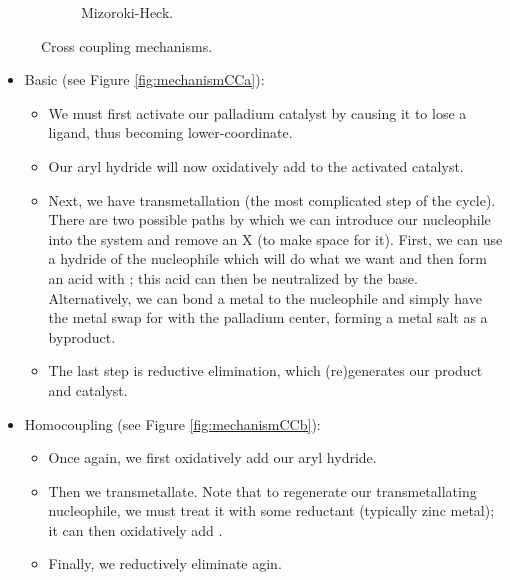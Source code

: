 \documentclass[../notes.tex]{subfiles}
\begin{document}
\begin{itemize}
\begin{figure}[h!]
\begin{subfigure}[b]{0.8\linewidth}
            \caption{Mizoroki-Heck.}
            \label{fig:mechanismCCc}
        \end{subfigure}
        \caption{Cross coupling mechanisms.}
        \label{fig:mechanismCC}
    \end{figure}
    \begin{itemize}
        \item Basic (see Figure \ref{fig:mechanismCCa}):
        \begin{itemize}
            \item We must first activate our palladium catalyst by causing it to lose a ligand, thus becoming lower-coordinate.
            \item Our aryl hydride will now oxidatively add to the activated catalyst.
            \item Next, we have transmetallation (the most complicated step of the cycle). There are two possible paths by which we can introduce our nucleophile into the system and remove an X (to make space for it). First, we can use a hydride of the nucleophile which will do what we want and then form an acid with ; this acid can then be neutralized by the base. Alternatively, we can bond a metal to the nucleophile and simply have the metal swap  for  with the palladium center, forming a metal salt as a byproduct.
            \item The last step is reductive elimination, which (re)generates our product and catalyst.
        \end{itemize}
        \item Homocoupling (see Figure \ref{fig:mechanismCCb}):
        \begin{itemize}
            \item Once again, we first oxidatively add our aryl hydride.
            \item Then we transmetallate. Note that to regenerate our transmetallating nucleophile, we must treat it with some reductant (typically zinc metal); it can then oxidatively add .
            \item Finally, we reductively eliminate agin.
        \end{itemize}

\end{itemize}
\end{itemize}
\end{document}
